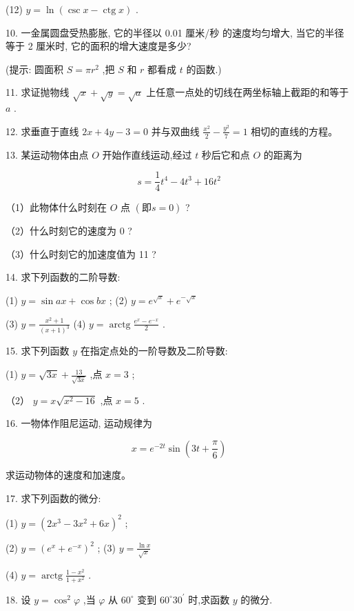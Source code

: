 \documentclass[lang=cn,newtx,10pt,scheme=chinese]{elegantbook}
\begin{document}
(12) \(y = \ln \left( {\csc x - \operatorname{ctg}x}\right)\) .

10. 一金属圆盘受热膨胀, 它的半径以 0.01 厘米/秒 的速度均匀增大, 当它的半径等于 2 厘米时, 它的面积的增大速度是多少?

(提示: 圆面积 \(S = \pi {r}^{2}\) ,把 \(S\) 和 \(r\) 都看成 \(t\) 的函数.)

11. 求证抛物线 \(\sqrt{x} + \sqrt{y} = \sqrt{a}\) 上任意一点处的切线在两坐标轴上截距的和等于 \(a\) .

12. 求垂直于直线 \({2x} + {4y} - 3 = 0\) 并与双曲线 \(\frac{{x}^{2}}{2} - \frac{{y}^{2}}{7} = 1\) 相切的直线的方程。

13. 某运动物体由点 \(O\) 开始作直线运动,经过 \(t\) 秒后它和点 \(O\) 的距离为

\[
s = \frac{1}{4}{t}^{4} - 4{t}^{3} + {16}{t}^{2}
\]

（1）此物体什么时刻在 \(O\) 点 \(\left( {\text{即}s = 0}\right)\) ?

（2）什么时刻它的速度为 0 ?

（3）什么时刻它的加速度值为 11 ?

14. 求下列函数的二阶导数:

(1) \(y = \sin {ax} + \cos {bx}\) ; (2) \(y = {e}^{\sqrt{x}} + {e}^{-\sqrt{x}}\)

(3) \(y = \frac{{x}^{2} + 1}{{\left( x + 1\right) }^{3}}\) (4) \(y = \operatorname{arctg}\frac{{e}^{x} - {e}^{-x}}{2}\) .

15. 求下列函数 \(y\) 在指定点处的一阶导数及二阶导数:

(1) \(y = \sqrt{3x} + \frac{13}{\sqrt{3x}}\) ,点 \(x = 3\) ;

（2） \(y = x\sqrt{{x}^{2} - {16}}\) ,点 \(x = 5\) .

16. 一物体作阻尼运动, 运动规律为

\[
x = {e}^{-{2t}}\sin \left( {{3t} + \frac{\pi }{6}}\right)
\]

求运动物体的速度和加速度。

17. 求下列函数的微分:

(1) \(y = {\left( 2{x}^{3} - 3{x}^{2} + 6x\right) }^{2}\) ;

(2) \(y = {\left( {e}^{x} + {e}^{-x}\right) }^{2}\) ; (3) \(y = \frac{\ln x}{\sqrt{x}}\)

(4) \(y = \operatorname{arctg}\frac{1 - {x}^{2}}{1 + {x}^{2}}\) .

18. 设 \(y = {\cos }^{2}\varphi\) ,当 \(\varphi\) 从 \({60}^{ \circ }\) 变到 \({60}^{ \circ }{30}^{\prime }\) 时,求函数 \(y\) 的微分.
\end{document}
